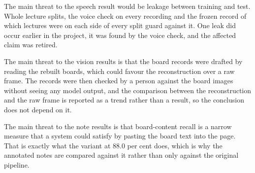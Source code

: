 The main threat to the speech result would be leakage between training and test. Whole
lecture splits, the voice check on every recording and the frozen record of which lectures
were on each side of every split guard against it. One leak did occur earlier in the
project, it was found by the voice check, and the affected claim was retired.

The main threat to the vision results is that the board records were drafted by reading
the rebuilt boards, which could favour the reconstruction over a raw frame. The records
were then checked by a person against the board images without seeing any model output,
and the comparison between the reconstruction and the raw frame is reported as a trend
rather than a result, so the conclusion does not depend on it.

The main threat to the note results is that board-content recall is a narrow measure that
a system could satisfy by pasting the board text into the page. That is exactly what the
variant at 88.0 per cent does, which is why the annotated notes are compared against it
rather than only against the original pipeline.
